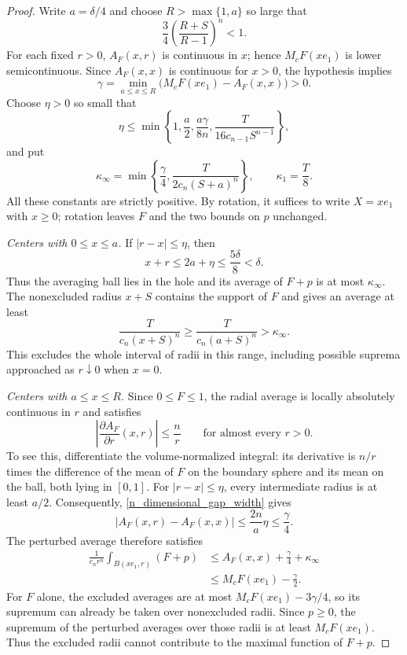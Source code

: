 \documentclass[12pt]{amsart}
\numberwithin{equation}{section}
\begin{document}
\begin{proof}
Write $a=\delta/4$ and choose $R>\max\{1,a\}$ so large that
\begin{equation}
\label{n_dimensional_tail_choice}
\frac34\left(\frac{R+S}{R-1}\right)^n<1.
\end{equation}
For each fixed $r>0$, $A_F(x,r)$ is continuous in $x$; hence
$M_cF(xe_1)$ is lower semicontinuous. Since $A_F(x,x)$ is continuous
for $x>0$, the hypothesis implies
\begin{equation}
\label{n_dimensional_compact_gap}
\gamma=\min_{a\leq x\leq R}
       \bigl(M_cF(xe_1)-A_F(x,x)\bigr)>0.
\end{equation}
Choose $\eta>0$ so small that
\begin{equation}
\label{n_dimensional_gap_width}
\eta\leq\min\left\{
 1,\frac{a}{2},\frac{a\gamma}{8n},
 \frac{T}{16c_{n-1}S^{n-1}}\right\},
\end{equation}
and put
\begin{equation}
\label{n_dimensional_stability_constants}
\kappa_\infty=\min\left\{\frac{\gamma}{4},
                   \frac{T}{2c_n(S+a)^n}\right\},
\qquad \kappa_1=\frac{T}{8}.
\end{equation}
All these constants are strictly positive.
By rotation, it suffices to write $X=xe_1$ with $x\geq0$; rotation
leaves $F$ and the two bounds on $p$ unchanged.

\medskip
\noindent\textit{Centers with $0\leq x\leq a$.}
If $|r-x|\leq\eta$, then
\[
x+r\leq2a+\eta\leq\frac{5\delta}{8}<\delta.
\]
Thus the averaging ball lies in the hole and its average of $F+p$
is at most $\kappa_\infty$. The nonexcluded radius $x+S$ contains
the support of $F$ and gives an average at least
\[
\frac{T}{c_n(x+S)^n}\geq\frac{T}{c_n(a+S)^n}
       >\kappa_\infty.
\]
This excludes the whole interval of radii in this range, including
possible suprema approached as $r\downarrow0$ when $x=0$.

\medskip
\noindent\textit{Centers with $a\leq x\leq R$.}
Since $0\leq F\leq1$, the radial average is locally absolutely
continuous in $r$ and satisfies
\[
\left|\frac{\partial A_F}{\partial r}(x,r)\right|
       \leq\frac{n}{r}
       \qquad\text{for almost every }r>0.
\]
To see this, differentiate the volume-normalized integral: its
derivative is $n/r$ times the difference of the mean of $F$ on
the boundary sphere and its mean on the ball, both lying in $[0,1]$.
For $|r-x|\leq\eta$, every intermediate radius is at least $a/2$.
Consequently, \eqref{n_dimensional_gap_width} gives
\[
|A_F(x,r)-A_F(x,x)|\leq\frac{2n}{a}\eta\leq\frac{\gamma}{4}.
\]
The perturbed average therefore satisfies
\begin{align*}
\frac{1}{c_nr^n}\int_{B(xe_1,r)}(F+p)
 &\leq A_F(x,x)+\frac{\gamma}{4}+\kappa_\infty\\
 &\leq M_cF(xe_1)-\frac{\gamma}{2}.
\end{align*}
For $F$ alone, the excluded averages are at most
$M_cF(xe_1)-3\gamma/4$, so its supremum can already be taken over
nonexcluded radii. Since $p\geq0$, the supremum of the perturbed
averages over those radii is at least $M_cF(xe_1)$. Thus the excluded
radii cannot contribute to the maximal function of $F+p$.


\end{proof}
\end{document}
